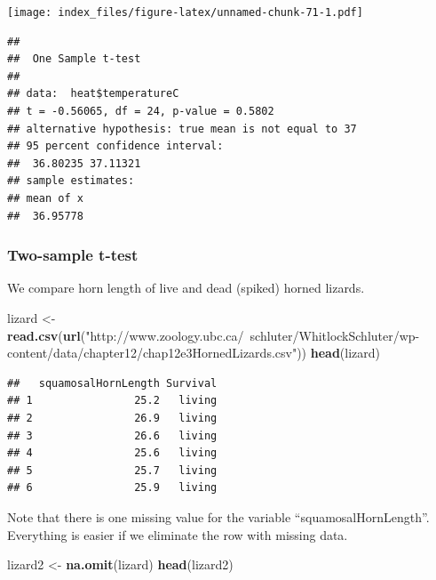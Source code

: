 \documentclass[]{article}
\newenvironment{Shaded}{\begin{snugshade}}{\end{snugshade}}
\newcommand{\DataTypeTok}[1]{\textcolor[rgb]{0.13,0.29,0.53}{#1}}
\newcommand{\KeywordTok}[1]{\textcolor[rgb]{0.13,0.29,0.53}{\textbf{#1}}}
\newcommand{\NormalTok}[1]{#1}
\newcommand{\OperatorTok}[1]{\textcolor[rgb]{0.81,0.36,0.00}{\textbf{#1}}}
\newcommand{\StringTok}[1]{\textcolor[rgb]{0.31,0.60,0.02}{#1}}
\begin{document}
\texttt{[image: index\_files/figure-latex/unnamed-chunk-71-1.pdf]}

\begin{Shaded}
\end{Shaded}

\begin{verbatim}
## 
##  One Sample t-test
## 
## data:  heat$temperatureC
## t = -0.56065, df = 24, p-value = 0.5802
## alternative hypothesis: true mean is not equal to 37
## 95 percent confidence interval:
##  36.80235 37.11321
## sample estimates:
## mean of x 
##  36.95778
\end{verbatim}

\hypertarget{two-sample-t-test}{%
\subsubsection{Two-sample t-test}\label{two-sample-t-test}}

We compare horn length of live and dead (spiked) horned lizards.

\begin{Shaded}
\begin{Highlighting}[]
\NormalTok{lizard <-}\StringTok{ }\KeywordTok{read.csv}\NormalTok{(}\KeywordTok{url}\NormalTok{(}\StringTok{"http://www.zoology.ubc.ca/~schluter/WhitlockSchluter/wp-content/data/chapter12/chap12e3HornedLizards.csv"}\NormalTok{))}
\KeywordTok{head}\NormalTok{(lizard)}
\end{Highlighting}
\end{Shaded}

\begin{verbatim}
##   squamosalHornLength Survival
## 1                25.2   living
## 2                26.9   living
## 3                26.6   living
## 4                25.6   living
## 5                25.7   living
## 6                25.9   living
\end{verbatim}

Note that there is one missing value for the variable
``squamosalHornLength''. Everything is easier if we eliminate the row
with missing data.

\begin{Shaded}
\begin{Highlighting}[]
\NormalTok{lizard2 <-}\StringTok{ }\KeywordTok{na.omit}\NormalTok{(lizard)}
\KeywordTok{head}\NormalTok{(lizard2)}
\end{Highlighting}
\end{Shaded}
\end{document}
